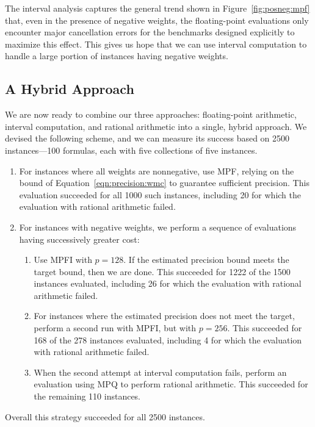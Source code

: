 \documentclass[letterpaper,USenglish,cleveref, autoref, thm-restate]{lipics-v2021}
\begin{document}
The interval analysis captures the general trend shown in
Figure~\ref{fig:posneg:mpf} that, even in the presence of negative
weights, the floating-point evaluations only encounter major
cancellation errors for the benchmarks designed explicitly to maximize
this effect.  This gives us hope that we can use interval computation
to handle a large portion of instances having negative weights.

\subsection{A Hybrid Approach}
\label{sect:hybrid}

We are now ready to combine our three approaches: floating-point
arithmetic, interval computation, and rational arithmetic into a
single, hybrid approach.  We devised the following scheme, and we can
measure its success based on 2500 instances---100 formulas, each with five collections of five instances.
\begin{enumerate}
\item For instances where all weights are nonnegative, use MPF,
  relying on the bound of Equation~\ref{eqn:precision:wmc} to
  guarantee sufficient precision.  This evaluation succeeded for all 1000 such
  instances, including 20 for which the evaluation with rational arithmetic failed.
\item For instances with negative weights, we perform a sequence of evaluations having successively greater cost:
\begin{enumerate}
\item 
  Use MPFI with $p=128$.  If the estimated precision
  bound meets the target bound, then we are done.  This succeeded for
  1222 of the 1500 instances evaluated, including 26 for which the evaluation with rational arithmetic failed.
\item For instances where the estimated precision does not meet the target, perform a second run with MPFI, but with $p=256$.  This succeeded
  for 168 of the 278 instances evaluated, including 4 for which the evaluation with rational arithmetic failed.
\item When the second attempt at interval computation fails, perform
  an evaluation using MPQ to perform rational arithmetic.  This
  succeeded for the remaining 110 instances.
\end{enumerate}
\end{enumerate}
Overall this strategy succeeded for all 2500 instances.
\end{document}
